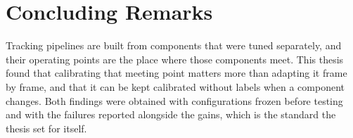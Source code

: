 \section{Concluding Remarks}\label{sec:c-final}
Tracking pipelines are built from components that were tuned separately, and their operating points are the place where those components meet. This thesis found that calibrating that meeting point matters more than adapting it frame by frame, and that it can be kept calibrated without labels when a component changes. Both findings were obtained with configurations frozen before testing and with the failures reported alongside the gains, which is the standard the thesis set for itself.
